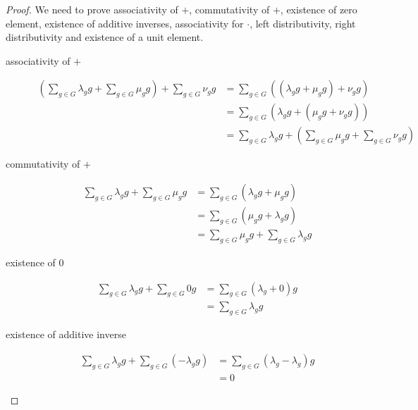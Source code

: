 \documentclass[titlepage, a4paper]{article}
\theoremstyle{remark}
\begin{document}
\begin{proof}
    We need to prove associativity of $+$, commutativity of $+$, existence of zero element, existence of additive inverses, associativity for $\cdot$, left distributivity, right distributivity and existence of a unit element.
    \begin{description}
    \item[associativity of $+$]
    \begin{align*}
    \left(\sum_{g \in G} \lambda_g g + \sum_{g \in G} \mu_g g\right)+ \sum_{g \in G} \nu_g g
    &= \sum_{g \in G} \left((\lambda_g g + \mu_g g)+\nu_g g\right) \\
    &= \sum_{g \in G} \left(\lambda_g g + (\mu_g g+\nu_g g)\right) \\
    &= \sum_{g \in G} \lambda_g g + \left(\sum_{g \in G} \mu_g g + \sum_{g \in G} \nu_g g \right)
    \end{align*}

    \item[commutativity of $+$]
    \begin{align*}
    \sum_{g \in G} \lambda_g g + \sum_{g \in G} \mu_g g
    &= \sum_{g \in G} (\lambda_g g + \mu_g g) \\
    &= \sum_{g \in G} (\mu_g g + \lambda_g g) \\
    &= \sum_{g \in G} \mu_g g + \sum_{g \in G} \lambda_g g 
    \end{align*}

    \item[existence of $0$]
    \begin{align*}
    \sum_{g \in G} \lambda_g g + \sum_{g \in G} 0 g
    &= \sum_{g \in G} (\lambda_g + 0)g \\
    &= \sum_{g \in G} \lambda_g g
    \end{align*}

    \item[existence of additive inverse]
    \begin{align*}
    \sum_{g \in G} \lambda_g g + \sum_{g \in G} (-\lambda_g g)
    &= \sum_{g \in G} (\lambda_g - \lambda_g) g \\
    &= 0
    \end{align*}


\end{description}
\end{proof}
\end{document}
